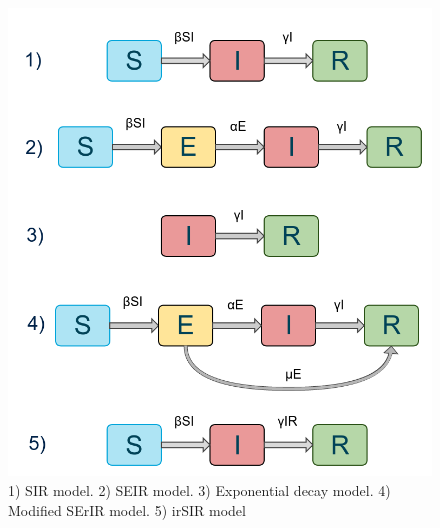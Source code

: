 \begin{figure}
\centering
\includegraphics[width=16cm]{images/models}
\caption{1) SIR model. 2) SEIR model. 3) Exponential decay model. 4)
  Modified SErIR model. 5) irSIR model}
\end{figure}

